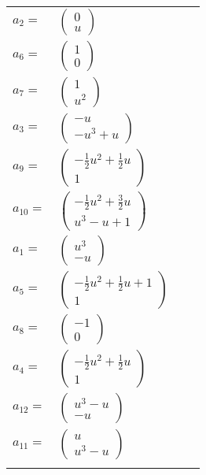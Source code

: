 \documentclass[1p]{elsarticle_modified}
\theoremstyle{definition}
\begin{document}
\begin{tabular}{m{7pt} m{180pt} m{7pt} m{180pt} }
\flushright $a_{2}=$&$\begin{pmatrix}0\\u\end{pmatrix}$ \\
\flushright $a_{6}=$&$\begin{pmatrix}1\\0\end{pmatrix}$ \\
\flushright $a_{7}=$&$\begin{pmatrix}1\\u^2\end{pmatrix}$ \\
\flushright $a_{3}=$&$\begin{pmatrix}- u\\- u^3+u\end{pmatrix}$ \\
\flushright $a_{9}=$&$\begin{pmatrix}-\frac{1}{2} u^2+\frac{1}{2} u\\1\end{pmatrix}$ \\
\flushright $a_{10}=$&$\begin{pmatrix}-\frac{1}{2} u^2+\frac{3}{2} u\\u^3- u+1\end{pmatrix}$ \\
\flushright $a_{1}=$&$\begin{pmatrix}u^3\\- u\end{pmatrix}$ \\
\flushright $a_{5}=$&$\begin{pmatrix}-\frac{1}{2} u^2+\frac{1}{2} u+1\\1\end{pmatrix}$ \\
\flushright $a_{8}=$&$\begin{pmatrix}-1\\0\end{pmatrix}$ \\
\flushright $a_{4}=$&$\begin{pmatrix}-\frac{1}{2} u^2+\frac{1}{2} u\\1\end{pmatrix}$ \\
\flushright $a_{12}=$&$\begin{pmatrix}u^3- u\\- u\end{pmatrix}$ \\
\flushright $a_{11}=$&$\begin{pmatrix}u\\u^3- u\end{pmatrix}$\\&\end{tabular}
\end{document}
